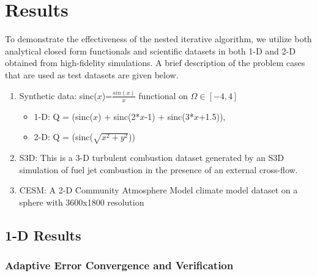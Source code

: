 
\section{Results}
\label{sec:results}

To demonstrate the effectiveness of the nested iterative algorithm, we utilize both analytical closed form functionals and scientific datasets in both 1-D and 2-D obtained from high-fidelity simulations. A brief description of the problem cases that are used as test datasets are given below.

\begin{enumerate}
	\item Synthetic data: sinc($x$)=$\frac{sin(x)}{x}$ functional on $\Omega \in [-4, 4]$
	\begin{itemize}
		\item 1-D: Q = (sinc($x$) + sinc(2*$x$-1) + sinc(3*$x$+1.5)), 
		\item 2-D: Q = (sinc($\sqrt{x^2+y^2}$))
	\end{itemize}
	\item S3D: This is a 3-D turbulent combustion dataset generated by an S3D simulation \cite{chen-s3d-2009} of fuel jet combustion in the presence of an external cross-flow. 
	\item CESM: A 2-D Community Atmosphere Model climate model dataset on a sphere with 3600x1800 resolution
\end{enumerate}


\subsection{1-D Results}\label{AA}


\subsubsection{Adaptive Error Convergence and Verification}

